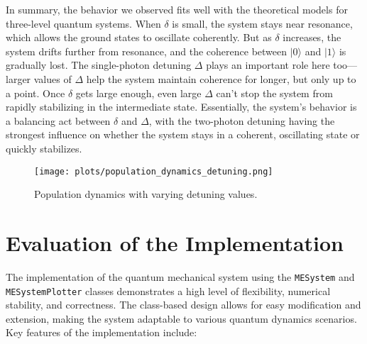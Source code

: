 \documentclass{article}
\begin{document}
In summary, the behavior we observed fits well with the theoretical models for three-level quantum systems. When \(\delta\) is small, the system stays near resonance, which allows the ground states to oscillate coherently. But as \(\delta\) increases, the system drifts further from resonance, and the coherence between \(|0\rangle\) and \(|1\rangle\) is gradually lost. The single-photon detuning \(\Delta\) plays an important role here too—larger values of \(\Delta\) help the system maintain coherence for longer, but only up to a point. Once \(\delta\) gets large enough, even large \(\Delta\) can’t stop the system from rapidly stabilizing in the intermediate state. Essentially, the system’s behavior is a balancing act between \(\delta\) and \(\Delta\), with the two-photon detuning having the strongest influence on whether the system stays in a coherent, oscillating state or quickly stabilizes.




\begin{figure}[h!]
    \centering
    \texttt{[image: plots/population\_dynamics\_detuning.png]}
    \caption{Population dynamics with varying detuning values.}
    \label{fig:delta_Delta_variation}
\end{figure}





\section{Evaluation of the Implementation}

The implementation of the quantum mechanical system using the \texttt{MESystem} and \texttt{MESystemPlotter} classes demonstrates a high level of flexibility, numerical stability, and correctness. The class-based design allows for easy modification and extension, making the system adaptable to various quantum dynamics scenarios. Key features of the implementation include:
\end{document}
